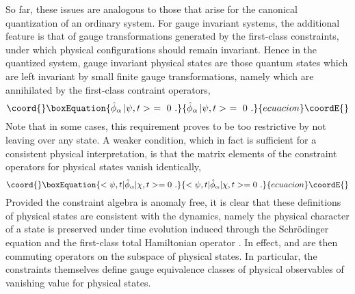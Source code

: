 \documentclass[a4paper,11pt]{article}
\begin{document}
So far, these issues are analogous to those that arise for the
canonical quantization of an ordinary system. For gauge invariant systems,
the additional feature is that of gauge transformations generated by the
first-class constraints, under which physical configurations should remain
invariant. Hence in the quantized system, gauge invariant physical states
are those quantum states which are left invariant by small finite gauge
transformations, namely which are annihilated by the first-class
contraint operators,
\begin{equation}\coord{}\boxEquation{
\hat{\phi}_\alpha\,|\psi,t>\ =\ 0\ .
}{
\hat{\phi}_\alpha\,|\psi,t>\ =\ 0\ .
}{ecuacion}\coordE{}\end{equation}
Note that in some cases, this requirement proves to be too restrictive
by not leaving over any state. A weaker condition, which in fact is
sufficient for a consistent physical interpretation, is that the
matrix elements of the constraint operators for physical states vanish
identically,
\begin{equation}\coord{}\boxEquation{
<\psi,t|\hat{\phi}_\alpha|\chi,t>=0\ .
}{
<\psi,t|\hat{\phi}_\alpha|\chi,t>=0\ .
}{ecuacion}\coordE{}\end{equation}
Provided the constraint algebra is anomaly free, it is clear that these
definitions of physical states are consistent with the dynamics, namely
the physical character of a state is preserved under time evolution induced
through the Schr\"odinger equation and the first-class total Hamiltonian
operator \coordHE{}. In effect, \coordHE{} and \myHighlight{$\hat{\phi}_\alpha$}\coordHE{}
are then commuting operators on the subspace of physical states.
In particular, the constraints themselves define gauge equivalence classes
of physical observables of vanishing value for physical states.
\end{document}
